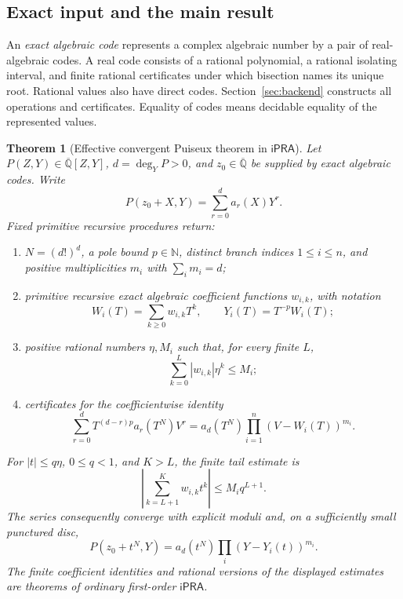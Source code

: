 \documentclass[11pt]{article}
\newtheorem{theorem}{Theorem}[section]
\theoremstyle{definition}
\newcommand{\N}{\mathbb N}
\newcommand{\A}{\overline{\mathbb Q}}
\newcommand{\ipra}{\ensuremath{\mathsf{iPRA}}}
\begin{document}
\subsection{Exact input and the main result}
An \emph{exact algebraic code} represents a complex algebraic number by a
pair of real-algebraic codes. A real code consists of a rational polynomial,
a rational isolating interval, and finite rational certificates under which
bisection names its unique root. Rational values also have direct codes.
Section~\ref{sec:backend} constructs all operations and certificates.
Equality of codes means decidable equality of the represented values.

\begin{theorem}[Effective convergent Puiseux theorem in \ipra]
\label{thm:main}
Let \(P(Z,Y)\in\A[Z,Y]\), \(d=\deg_Y P>0\), and \(z_0\in\A\) be supplied
by exact algebraic codes. Write
\[
 P(z_0+X,Y)=\sum_{r=0}^d a_r(X)Y^r.
\]
Fixed primitive recursive procedures return:
\begin{enumerate}
\item \(N=(d!)^d\), a pole bound \(p\in\N\), distinct branch indices
      \(1\le i\le n\), and positive multiplicities \(m_i\) with
      \(\sum_i m_i=d\);
\item primitive recursive exact algebraic coefficient functions
      \(w_{i,k}\), with notation
      \[
      W_i(T)=\sum_{k\ge0}w_{i,k}T^k,\qquad Y_i(T)=T^{-p}W_i(T);
      \]
\item positive rational numbers \(\eta,M_i\) such that, for every finite \(L\),
      \begin{equation}
       \sum_{k=0}^L |w_{i,k}|\eta^k\le M_i;
       \label{eq:main-weight}
      \end{equation}
\item certificates for the coefficientwise identity
      \begin{equation}
       \sum_{r=0}^d T^{(d-r)p}a_r(T^N)V^r
       =a_d(T^N)\prod_{i=1}^n(V-W_i(T))^{m_i}.
       \label{eq:main-cleared}
      \end{equation}
\end{enumerate}
For \(|t|\le q\eta\), \(0\le q<1\), and \(K>L\), the finite tail estimate is
\begin{equation}
 \left|\sum_{k=L+1}^K w_{i,k}t^k\right|\le M_iq^{L+1}.
 \label{eq:main-tail}
\end{equation}
The series consequently converge with explicit moduli and, on a sufficiently
small punctured disc,
\[
 P(z_0+t^N,Y)=a_d(t^N)\prod_i(Y-Y_i(t))^{m_i}.
\]
The finite coefficient identities and rational versions of the displayed
estimates are theorems of ordinary first-order \ipra.
\end{theorem}
\end{document}

